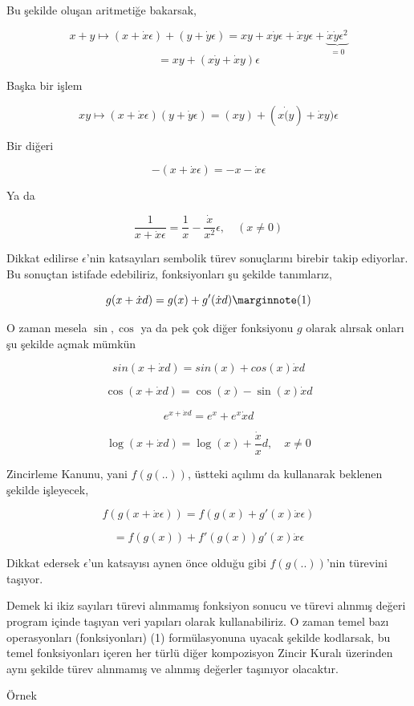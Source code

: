\documentclass[12pt,fleqn]{article}\usepackage{../../common}
\begin{document}
Bu şekilde oluşan aritmetiğe bakarsak,

$$ 
x + y \mapsto 
(x+\dot{x}\epsilon)  + (y+\dot{y}\epsilon) = 
xy + x\dot{y}\epsilon + \dot{x}y\epsilon +
\underbrace{\dot{x}\dot{y}\epsilon^2}_{=0} 
$$
$$  = xy + (x\dot{y} + \dot{x}y)\epsilon  $$

Başka bir işlem

$$ xy \mapsto (x+\dot{x}\epsilon)(y+\dot{y}\epsilon)  =
(xy) + (x\dot(y) + \dot{x}y)\epsilon
$$

Bir diğeri

$$ -(x+\dot{x}\epsilon) = -x - \dot{x}\epsilon$$ 

Ya da

$$ 
\frac{1}{x+\dot{x}\epsilon} = 
\frac{1}{x} - \frac{\dot{x}}{x^2}\epsilon, \quad (x \ne 0)
$$

Dikkat edilirse $\epsilon$'nin katsayıları sembolik türev sonuçlarını
birebir takip ediyorlar. Bu sonuçtan istifade edebiliriz, fonksiyonları şu
şekilde tanımlarız,

$$ 
g(x + \dot{x}d) = g(x) + g'(\dot{x}d) 
\mlabel{1}
$$

O zaman mesela $\sin,\cos$ ya da pek çok diğer fonksiyonu $g$ olarak
alırsak onları şu şekilde açmak mümkün

$$ sin(x + \dot{x}d) = sin(x) + cos(x)\dot{x}d $$

$$ \cos(x+\dot{x}d) = \cos(x) - \sin(x)\dot{x}d$$

$$ e^{x+\dot{x}d} = e^x + e^x \dot{x}d$$

$$ \log(x + \dot{x}d) = \log(x) + \frac{\dot{x}}{x}d , \quad x \ne 0$$

Zincirleme Kanunu, yani $f(g(..))$, üstteki açılımı da kullanarak beklenen
şekilde işleyecek,

$$ f(g(x + \dot{x}\epsilon)) =  f(g(x) + g'(x)\dot{x}\epsilon)  $$

$$ = f(g(x)) + f'(g(x))g'(x)\dot{x} \epsilon$$

Dikkat edersek $\epsilon$'un katsayısı aynen önce olduğu gibi
$f(g(..))$'nin türevini taşıyor. 

Demek ki ikiz sayıları türevi alınmamış fonksiyon sonucu ve türevi alınmış
değeri program içinde taşıyan veri yapıları olarak kullanabiliriz. O
zaman temel bazı operasyonları (fonksiyonları) (1) formülasyonuna uyacak
şekilde kodlarsak, bu temel fonksiyonları içeren her türlü diğer
kompozisyon Zincir Kuralı üzerinden aynı şekilde türev alınmamış ve alınmış
değerler taşınıyor olacaktır.

Örnek
\end{document}
